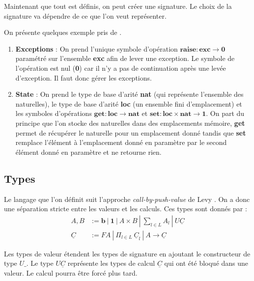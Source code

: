 	Maintenant que tout est définis, on peut créer une signature. Le choix de la signature va dépendre de ce que l'on veut représenter.
	\newpage
	\begin{exemple}\label{exStateExc}
		On présente quelques exemple pris de \cite{DBLP:journals/tcs/HylandPP06}.
		\begin{enumerate}
			\item[]\textbf{Exceptions} : On prend l'unique symbole d'opération $\textbf{raise} : \textbf{exc} \rightarrow \textbf{0}$ paramétré sur l'ensemble \textbf{exc} afin de lever une exception. Le symbole de l'opération est nul (\textbf{0}) car il n'y a pas de continuation après une levée d'exception. Il faut donc gérer les exceptions.
			
			\item[]\textbf{State} : On prend le type de base d'arité \textbf{nat} (qui représente l'ensemble des naturelles), le type de base d'arité \textbf{loc} (un ensemble fini d'emplacement) et les symboles d'opérations $\textbf{get} : \textbf{loc} \rightarrow \textbf{nat}$ et $\textbf{set} : \textbf{loc} \times \textbf{nat} \rightarrow \textbf{1}$. On part du principe que l'on stocke des naturelles dans des emplacements mémoire, \textbf{get} permet de récupérer le naturelle pour un emplacement donné tandis que \textbf{set} remplace l'élément à l'emplacement donné en paramètre par le second élément donné en paramètre et ne retourne rien. 
		\end{enumerate}
	\end{exemple}

\subsection{Types}
	
	Le langage que l'on définit suit l'approche \textit{call-by-push-value} de Levy \cite{DBLP:journals/lisp/Levy06}. On a donc une séparation stricte entre les valeurs et les calculs. Ces types sont donnés par : 
	\begin{align*}
		A,B &:= \textbf{b}~|~\textbf{1}~|~A \times B~|~\sum_{l \in L} A_l~|~U\underline{C}\\
		\underline{C} &:= FA~|~\Pi_{l\in L}~\underline{C}_l~|~A \rightarrow\underline{C}
	\end{align*}
	
	Les types de valeur étendent les types de signature en ajoutant le constructeur de type $U\_$. Le type $U\underline{C}$ représente les types de calcul $\underline{C}$ qui ont été bloqué dans une valeur. Le calcul pourra être forcé plus tard.
	
